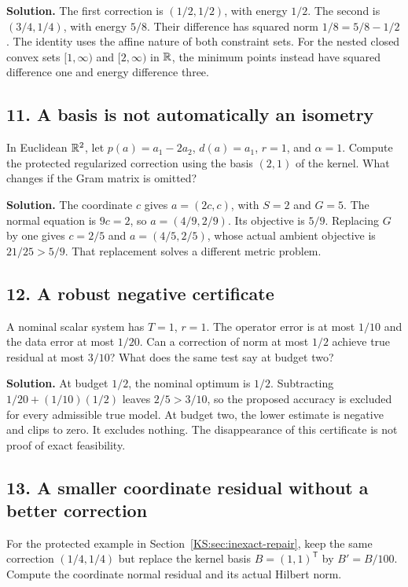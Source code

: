 \documentclass[11pt,oneside,openany]{book}
\numberwithin{equation}{section}
\begin{document}
\textbf{Solution.} The first correction is $(1/2,1/2)$, with energy $1/2$. The second is $(3/4,1/4)$, with energy $5/8$. Their difference has squared norm $1/8=5/8-1/2$. The identity uses the affine nature of both constraint sets. For the nested closed convex sets $[1,\infty)$ and $[2,\infty)$ in $\mathbb R$, the minimum points instead have squared difference one and energy difference three.

\subsection*{11. A basis is not automatically an isometry}
In Euclidean $\mathbb R^2$, let $p(a)=a_1-2a_2$, $d(a)=a_1$, $r=1$, and $\alpha=1$. Compute the protected regularized correction using the basis $(2,1)$ of the kernel. What changes if the Gram matrix is omitted?

\textbf{Solution.} The coordinate $c$ gives $a=(2c,c)$, with $S=2$ and $G=5$. The normal equation is $9c=2$, so $a=(4/9,2/9)$. Its objective is $5/9$. Replacing $G$ by one gives $c=2/5$ and $a=(4/5,2/5)$, whose actual ambient objective is $21/25>5/9$. That replacement solves a different metric problem.

\subsection*{12. A robust negative certificate}
A nominal scalar system has $T=1$, $r=1$. The operator error is at most $1/10$ and the data error at most $1/20$. Can a correction of norm at most $1/2$ achieve true residual at most $3/10$? What does the same test say at budget two?

\textbf{Solution.} At budget $1/2$, the nominal optimum is $1/2$. Subtracting $1/20+(1/10)(1/2)$ leaves $2/5>3/10$, so the proposed accuracy is excluded for every admissible true model. At budget two, the lower estimate is negative and clips to zero. It excludes nothing. The disappearance of this certificate is not proof of exact feasibility.

\subsection*{13. A smaller coordinate residual without a better correction}
For the protected example in Section~\ref{KS:sec:inexact-repair}, keep the same correction $(1/4,1/4)$ but replace the kernel basis $B=(1,1)^{\mathsf T}$ by $B'=B/100$. Compute the coordinate normal residual and its actual Hilbert norm.
\end{document}
